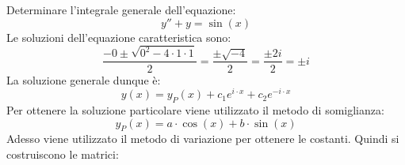 \documentclass[a4paper]{article}
\begin{document}
	\noindent
	Determinare l'integrale generale dell'equazione:
	\begin{equation*}
		y'' + y = \sin\left(x\right)
	\end{equation*}
	Le soluzioni dell'equazione caratteristica sono:
	\begin{equation*}
		\dfrac{-0 \pm \sqrt{0^{2} - 4 \cdot 1 \cdot 1}}{2} = \dfrac{\pm\sqrt{-4}}{2} = \dfrac{\pm2i}{2} = \pm i
	\end{equation*}
	La soluzione generale dunque è:
	\begin{equation*}
		y\left(x\right) = y_{P}\left(x\right) + c_{1} e^{i \cdot x} + c_{2} e^{-i \cdot x}
	\end{equation*}
	Per ottenere la soluzione particolare viene utilizzato il metodo di somiglianza:
	\begin{equation*}
		y_{P}\left(x\right) = a \cdot \cos\left(x\right) + b \cdot \sin\left(x\right)
	\end{equation*}
	Adesso viene utilizzato il metodo di variazione per ottenere le costanti. Quindi si costruiscono le matrici:
\end{document}
